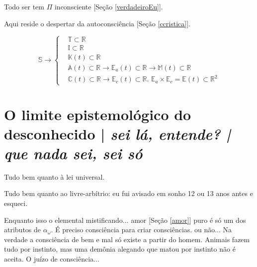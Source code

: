 \documentclass[12pt,a4paper]{article}
\begin{document}
			Todo ser tem $\Pi$ inconsciente [Se\c{c}\~ao \ref{verdadeiroEu}].

			Aqui reside o despertar da autoconsci\^encia [Se\c{c}\~ao \ref{ccristica}].

\begin{equation*}
	\mathbb{S} \rightarrow
	\left\{\begin{aligned}
	    &\mathbb{T} \subset \mathbb{R} \\
	    &\mathbb{I} \subset \mathbb{R} \\
	    &\mathbb{K}(t) \subset \mathbb{R} \\
		&\mathbb{A}(t) \subset \mathbb{R} \rightarrow \mathbb{E}_a(t) \subset \mathbb{R} \rightarrow \mathbb{M}(t) \subset \mathbb{R} \\
		&\mathbb{C}(t) \subset \mathbb{R} \rightarrow \mathbb{E}_c(t) \subset \mathbb{R}. \,\, \mathbb{E}_a \times \mathbb{E}_c = \mathbb{E}(t) \subset \mathbb{R}^2
	\end{aligned}
	\right.
\end{equation*}

	\section {O limite epistemol\'ogico do desconhecido | \emph{ sei l\'a, entende? | que nada sei, sei s\'o}}\label{epistemologia}
		\begin{flushright}
		\end{flushright}

		Tudo bem quanto \`a lei universal.

		Tudo bem quanto ao livre-arb\'itrio: eu fui avisado em sonho\cite{x} 12 ou 13 anos antes e esqueci.

		\begin{center}
		\end{center}

		Enquanto isso o elemental mistificando... amor [Se\c{c}\~ao \ref{amor}] puro \'e s\'o um dos atributos de $ \alpha_\omega $. \'E preciso consci\^encia para criar consci\^encias. ou n\~ao... Na verdade a consci\^encia de bem e mal s\'o existe a partir do homem. Animais fazem tudo por instinto, mas uma dem\^onia\cite{x} alegando que matou por instinto n\~ao \'e aceita. O ju\'izo de consci\^encia...

		\begin{center}

		\end{center}
\end{document}
